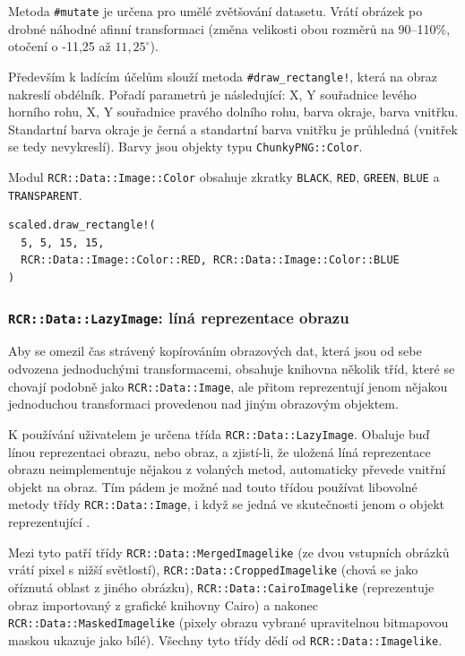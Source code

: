 \documentclass[a4paper]{article}
\begin{document}
Metoda \texttt{\#mutate} je určena pro umělé zvětšování datasetu. Vrátí obrázek
po drobné náhodné afinní transformaci (změna velikosti obou rozměrů na 90--110\%,
otočení o -11,25 až $11,25^\circ$).

Především k ladícím účelům slouží metoda \texttt{\#draw\_rectangle!}, která na
obraz nakreslí obdélník. Pořadí parametrů je následující: X, Y souřadnice levého
horního rohu, X, Y souřadnice pravého dolního rohu, barva okraje, barva vnitřku.
Standartní barva okraje je černá a standartní barva vnitřku je průhledná
(vnitřek se tedy nevykreslí). Barvy jsou objekty typu \texttt{ChunkyPNG::Color}.

Modul \texttt{RCR::Data::Image::Color} obsahuje zkratky \texttt{BLACK},
\texttt{RED}, \texttt{GREEN}, \texttt{BLUE} a \texttt{TRANSPARENT}.
\begin{lstlisting}
scaled.draw_rectangle!(
  5, 5, 15, 15,
  RCR::Data::Image::Color::RED, RCR::Data::Image::Color::BLUE
)
\end{lstlisting}

\subsubsection{\texttt{RCR::Data::LazyImage}: líná reprezentace obrazu}
Aby se omezil čas strávený kopírováním obrazových dat, která jsou od sebe
odvozena jednoduchými transformacemi, obsahuje knihovna několik tříd, které
se chovají podobně jako \texttt{RCR::Data::Image}, ale přitom reprezentují
jenom nějakou jednoduchou transformaci provedenou nad jiným obrazovým objektem.

K používání uživatelem je určena třída \texttt{RCR::Data::LazyImage}.
Obaluje buď línou reprezentaci obrazu, nebo obraz, a zjistí-li, že uložená
líná reprezentace obrazu neimplementuje nějakou z volaných metod, automaticky
převede vnitřní objekt na obraz. Tím pádem je možné nad touto třídou používat
libovolné metody třídy \texttt{RCR::Data::Image}, i když se jedná ve skutečnosti
jenom o objekt reprezentující .

Mezi tyto  patří třídy
\texttt{RCR::Data::MergedImagelike} (ze dvou vstupních obrázků vrátí pixel
s nižší světlostí), \texttt{RCR::Data::CroppedImagelike} (chová se jako
oříznutá oblast z jiného obrázku), \texttt{RCR::Data::CairoImagelike}
(reprezentuje obraz importovaný z grafické knihovny Cairo) a nakonec
\texttt{RCR::Data::MaskedImagelike} (pixely obrazu vybrané upravitelnou
bitmapovou maskou ukazuje jako bílé).
Všechny tyto třídy dědí od \texttt{RCR::Data::Imagelike}.
\end{document}
